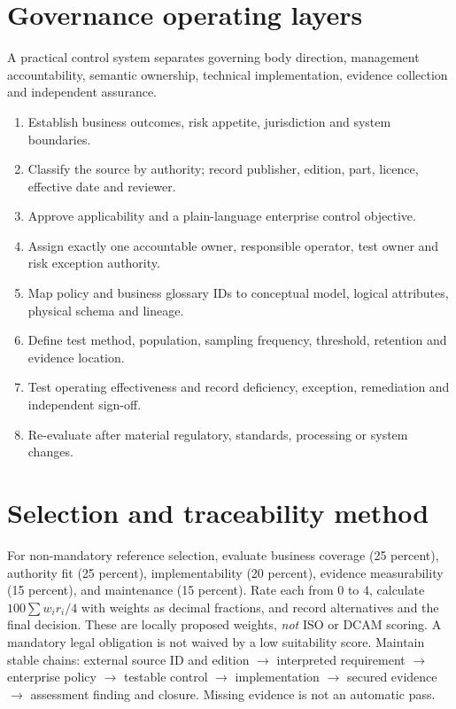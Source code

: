\documentclass[11pt,letterpaper]{article}
\begin{document}
\section{Governance operating layers}
A practical control system separates governing body direction, management accountability, semantic ownership, technical implementation, evidence collection and independent assurance.
\begin{enumerate}
\item Establish business outcomes, risk appetite, jurisdiction and system boundaries.
\item Classify the source by authority; record publisher, edition, part, licence, effective date and reviewer.
\item Approve applicability and a plain-language enterprise control objective.
\item Assign exactly one accountable owner, responsible operator, test owner and risk exception authority.
\item Map policy and business glossary IDs to conceptual model, logical attributes, physical schema and lineage.
\item Define test method, population, sampling frequency, threshold, retention and evidence location.
\item Test operating effectiveness and record deficiency, exception, remediation and independent sign-off.
\item Re-evaluate after material regulatory, standards, processing or system changes.
\end{enumerate}

\section{Selection and traceability method}
For non-mandatory reference selection, evaluate business coverage (25 percent), authority fit (25 percent), implementability (20 percent), evidence measurability (15 percent), and maintenance (15 percent). Rate each from 0 to 4, calculate \(100\sum w_i r_i/4\) with weights as decimal fractions, and record alternatives and the final decision. These are locally proposed weights, \emph{not} ISO or DCAM scoring. A mandatory legal obligation is not waived by a low suitability score.
Maintain stable chains: external source ID and edition \(\rightarrow\) interpreted requirement \(\rightarrow\) enterprise policy \(\rightarrow\) testable control \(\rightarrow\) implementation \(\rightarrow\) secured evidence \(\rightarrow\) assessment finding and closure. Missing evidence is not an automatic pass.
\end{document}
